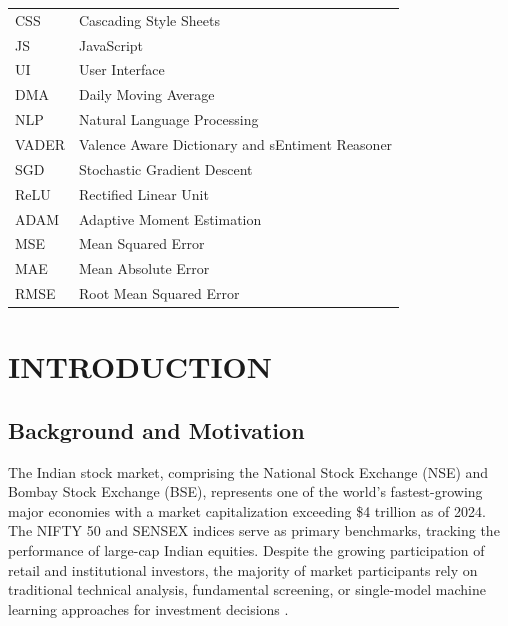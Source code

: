 \documentclass[12pt,a4paper]{report}
\begin{document}
\begin{longtable}{@{}p{3.5cm}p{12.5cm}@{}}
CSS & Cascading Style Sheets \\
JS & JavaScript \\
UI & User Interface \\
DMA & Daily Moving Average \\
NLP & Natural Language Processing \\
VADER & Valence Aware Dictionary and sEntiment Reasoner \\
SGD & Stochastic Gradient Descent \\
ReLU & Rectified Linear Unit \\
ADAM & Adaptive Moment Estimation \\
MSE & Mean Squared Error \\
MAE & Mean Absolute Error \\
RMSE & Root Mean Squared Error \\
\bottomrule
\end{longtable}

\newpage
{}
\setcounter{page}{1}

\chapter{INTRODUCTION}

\section{Background and Motivation}
The Indian stock market, comprising the National Stock Exchange (NSE) and Bombay Stock Exchange (BSE), represents one of the world's fastest-growing major economies with a market capitalization exceeding \$4 trillion as of 2024. The NIFTY 50 and SENSEX indices serve as primary benchmarks, tracking the performance of large-cap Indian equities. Despite the growing participation of retail and institutional investors, the majority of market participants rely on traditional technical analysis, fundamental screening, or single-model machine learning approaches for investment decisions \cite{bhat2021machine}.
\end{document}
